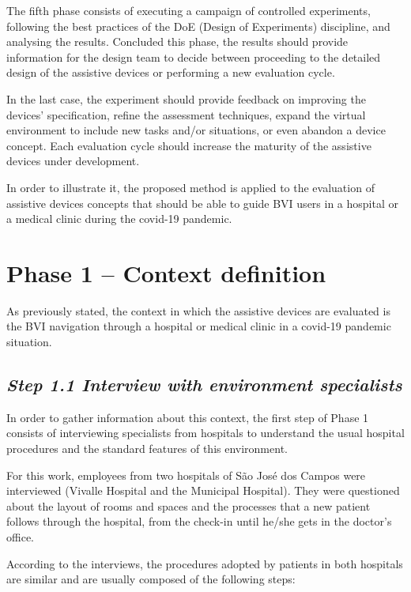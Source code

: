 The fifth phase consists of executing a campaign of controlled experiments, following the best practices of the DoE (Design of Experiments) discipline, and analysing the results. Concluded this phase, the results should provide information for the design team to decide between proceeding to the detailed design of the assistive devices or performing a new evaluation cycle.

In the last case, the experiment should provide feedback on improving the devices' specification, refine the assessment techniques, expand the virtual environment to include new tasks and/or situations, or even abandon a device concept. Each evaluation cycle should increase the maturity of the assistive devices under development.

In order to illustrate it, the proposed method is applied to the evaluation of assistive devices concepts that should be able to guide BVI users in a hospital or a medical clinic during the covid-19 pandemic.

\section{Phase 1 – Context definition}
\label{sec:interviews_phase}
    As previously stated, the context in which the assistive devices are evaluated is the BVI navigation through a hospital or medical clinic in a covid-19 pandemic situation. 

    \subsection*{\textit{Step 1.1 Interview with environment specialists}}
    
        In order to gather information about this context, the first step of Phase 1 consists of interviewing specialists from hospitals to understand the usual hospital procedures and the standard features of this environment.
        
        For this work, employees from two hospitals of São José dos Campos were interviewed (Vivalle Hospital and the Municipal Hospital). They were questioned about the layout of rooms and spaces and the processes that a new patient follows through the hospital, from the check-in until he/she gets in the doctor's office. 

        According to the interviews, the procedures adopted by patients in both hospitals are similar and are usually composed of the following steps:

